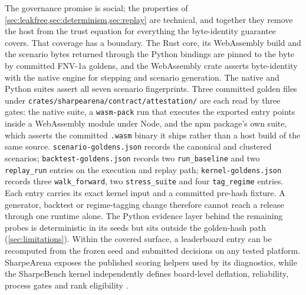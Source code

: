 The governance promise is social; the properties of \cref{sec:leakfree,sec:determinism,sec:replay} are technical, and together they remove the host from the trust equation for everything the byte-identity guarantee covers. That coverage has a boundary. The Rust core, its WebAssembly build and the scenario bytes returned through the Python bindings are pinned to the byte by committed FNV-1a goldens, and the WebAssembly crate asserts byte-identity with the native engine for stepping and scenario generation. The native and Python suites assert all seven scenario fingerprints. Three committed golden files under \texttt{crates/sharpearena/contract/attestation/} are each read by three gates: the native suite, a \texttt{wasm-pack} run that executes the exported entry points inside a WebAssembly module under Node, and the npm package's own suite, which asserts the committed \texttt{.wasm} binary it ships rather than a host build of the same source. \texttt{scenario-goldens.json} records the canonical and clustered scenarios; \texttt{backtest-goldens.json} records two \texttt{run\_baseline} and two \texttt{replay\_run} entries on the execution and replay path; \texttt{kernel-goldens.json} records three \texttt{walk\_forward}, two \texttt{stress\_suite} and four \texttt{tag\_regime} entries. Each entry carries its exact kernel input and a committed pre-hash fixture. A generator, backtest or regime-tagging change therefore cannot reach a release through one runtime alone. The Python evidence layer behind the remaining probes is deterministic in its seeds but sits outside the golden-hash path (\cref{sec:limitations}). Within the covered surface, a leaderboard entry can be recomputed from the frozen seed and submitted decisions on any tested platform. SharpeArena exposes the published scoring helpers used by its diagnostics, while the SharpeBench kernel independently defines board-level deflation, reliability, process gates and rank eligibility \citep{toca2026sharpebench,bailey2014deflated}.
